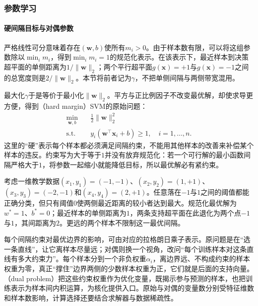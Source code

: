 \subsubsection{参数学习}
\label{sec:classification-svm-learning}

\paragraph{硬间隔目标与对偶参数}
严格线性可分意味着存在$(\bm{w},b)$使所有$m_i>0$。由于样本数有限，可以将这组参数除以$\min_i m_i$，得到$\min_i m_i=1$的规范化表示。在该表示下，最近样本到决策超平面的单侧距离为$1/\lVert\bm{w}\rVert_2$；两个平行超平面$g(\bm{x})=+1$与$g(\bm{x})=-1$之间的总宽度则是$2/\lVert\bm{w}\rVert_2$。本节将前者记为$\gamma$，不把单侧间隔与两侧带宽混用。

最大化$\gamma$于是等价于最小化$\lVert\bm{w}\rVert_2$。平方与正比例因子不改变最优解，却使求导更方便，得到（hard margin）SVM的原始问题：
\begin{equation}
  \begin{aligned}
    \min_{\bm{w},b}\quad&
      \frac12\lVert\bm{w}\rVert_2^2\\
    \text{s.t.}\quad&
      y_i(\bm{w}^{\top}\bm{x}_i+b)\ge1,
      \quad i=1,\ldots,n.
  \end{aligned}
  \label{eq:classification-svm-hard-primal}
\end{equation}
这里的“硬”表示每个样本都必须满足间隔约束，不能用其他样本的改善来补偿某个样本的违反。约束写为大于等于$1$并没有放弃规范化：若一个可行解的最小函数间隔严格大于$1$，将参数一起缩小就能降低目标，所以最优解必有紧约束。

\begin{example}[单侧间隔与带宽]
  \label{ex:classification-svm-one-dimensional}
  考虑一维教学数据$(x_1,y_1)=(-1,-1)$、$(x_2,y_2)=(1,+1)$、$(x_3,y_3)=(-2,-1)$和$(x_4,y_4)=(2,+1)$。任意落在$-1$与$1$之间的阈值都能正确分类，但只有阈值$0$使两侧最近距离的较小者达到最大。规范化最优解为$w^{\ast}=1$、$b^{\ast}=0$；最近样本的单侧距离为$1$，两条支持超平面在此退化为两个点$-1$与$1$，其间距离为$2$。更远的两个样本不限制这一最优间隔。
\end{example}

每个间隔约束对最优边界的影响，可由对应的拉格朗日乘子表示。原问题是在“选一条直线”，让它离样本尽量远；对偶则换一个视角，改问“每个训练样本对这条直线有多大约束力”。每个样本分到一个非负权重$\alpha_i$，离边界远、不构成约束的样本权重为零，真正“撑住”边界两侧的少数样本权重为正，它们就是后面的支持向量。（dual problem）把这些约束权重作为优化变量，既揭示参与预测的样本，也把训练表示为样本间内积运算，为核化提供入口。原始与对偶的变量数分别受特征维数和样本数影响，计算选择还要结合求解器与数据稀疏性。

